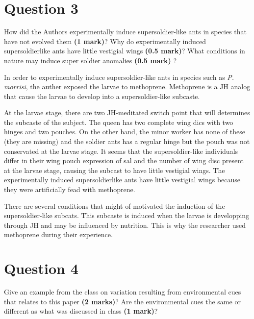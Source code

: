 \documentclass[letterpaper,12pt]{article}
\newenvironment{myindentpar}[1]%
{\begin{list}{}%
          {\setlength{\leftmargin}{#1}}%
          \item[]%
}
{\end{list}}
\begin{document}
\section*{Question 3}

How did the Authors experimentally induce supersoldier-like ants in species that have not evolved them \textbf{(1 mark)}? Why do experimentally induced supersoldierlike ants have little vestigial wings \textbf{(0.5 mark)}? What conditions in nature may induce super soldier anomalies \textbf{(0.5 mark)} ?
\vspace*{10px}

\begin{myindentpar}{0.5cm}
In order to experimentally induce supersoldier-like ants in species such as \textit{P. morrisi}, the auther exposed the larvae to methoprene. Methoprene is a JH analog that cause the larvae to develop into a supersoldier-like subcaste.

At the larvae stage, there are two JH-meditated switch point that will determines the subcaste of the subject. The queen has two complete wing dics with two hinges and two pouches. On the other hand, the minor worker has none of these (they are missing) and the soldier ants has a regular hinge but the pouch was not conservated at the larvae stage. It seems that the supersoldier-like individuals differ in their wing pouch expression of sal and the number of wing disc present at the larvae stage, causing the subcast to have little vestigial wings. The experimentally induced supersoldierlike ants have little vestigial wings because they were artificially fead with methoprene.

There are several conditions that might of motivated the induction of the supersoldier-like subcats. This subcaste is induced when the larvae is developping through JH and may be influenced by nutrition. This is why the researcher used methoprene during their experience.
\end{myindentpar}



\section*{Question 4}

Give an example from the class on variation resulting from environmental cues that relates to this paper \textbf{(2 marks)}? Are the environmental cues the same or different as what was discussed in class \textbf{(1 mark)}?
\vspace*{10px}
\end{document}

